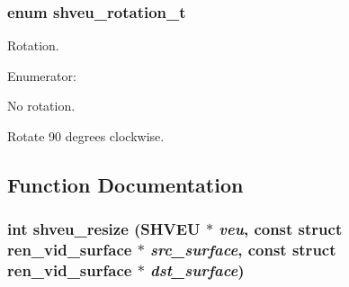 \subsubsection[{shveu\_\-rotation\_\-t}]{\setlength{\rightskip}{0pt plus 5cm}enum {\bf shveu\_\-rotation\_\-t}}\label{veu__colorspace_8h_abb87bfd1257c5e4f6d46f3fdc0e64d75}


Rotation. 

\begin{Desc}
\item[Enumerator: ]\par
\begin{description}
\item[{\em 
SHVEU\_\-NO\_\-ROT\label{veu__colorspace_8h_abb87bfd1257c5e4f6d46f3fdc0e64d75a86ae5d6620cd79b5a7069bac7a37d4bc}
}]No rotation. \item[{\em 
SHVEU\_\-ROT\_\-90\label{veu__colorspace_8h_abb87bfd1257c5e4f6d46f3fdc0e64d75a03d1d6204b32893a2e4b6e1ae1cb650a}
}]Rotate 90 degrees clockwise. \end{description}
\end{Desc}



\subsection{Function Documentation}
\subsubsection[{shveu\_\-resize}]{\setlength{\rightskip}{0pt plus 5cm}int shveu\_\-resize (SHVEU $\ast$ {\em veu}, \/  const struct {\bf ren\_\-vid\_\-surface} $\ast$ {\em src\_\-surface}, \/  const struct {\bf ren\_\-vid\_\-surface} $\ast$ {\em dst\_\-surface})}\label{veu__colorspace_8h_a3b5381632c20c6a346ccc4e0dfcf6eb7}


